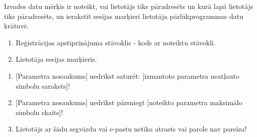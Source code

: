 {
	Izvades datu mērķis ir noteikt, vai lietotājs tiks pāradresēts un kurā lapā lietotājs tiks pāradresēts, un ierakstīt sesijas marķieri lietotāja pārlūkprogrammas datu krātuvē.
	\begin{enumerate}
		\item Reģistrācijas apstiprinājuma stāvoklis - kods ar noteiktu stāvokli.
		\item Lietotāja sesijas marķieris.
	\end{enumerate}
}
{
	\begin{enumerate}
		\item {}[Parametra nosaukums] nedrīkst saturēt: [izmantoto parametra neatļauto simbolu saraksts]!
		\item {}[Parametra nosaukums] nedrīkst pārsniegt [noteikto parametra maksimālo simbolu skaits]!
		\item {}Lietotājs ar šādu segvārdu vai e-pastu netika atrasts vai parole nav pareiza!
	\end{enumerate}
}
